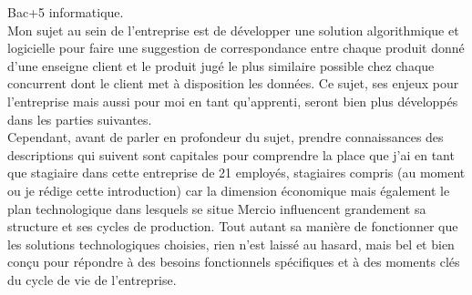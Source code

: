 \documentclass{rapportCS}
\begin{document}
	Bac+5 informatique.\\
	Mon sujet au sein de l'entreprise est de développer une solution algorithmique et logicielle pour 
	faire une suggestion de correspondance entre chaque produit donné d'une enseigne client et le 
	produit jugé le plus similaire possible chez chaque concurrent 
	dont le client met à disposition les données. 
	Ce sujet, ses enjeux pour l'entreprise mais aussi pour moi en tant qu'apprenti,
	seront bien plus développés dans les parties suivantes.\\
	Cependant, avant de parler en profondeur du sujet, prendre connaissances des descriptions qui
	suivent sont capitales pour comprendre la place que j'ai en tant que stagiaire dans cette 
	entreprise de 21 employés, stagiaires compris (au moment ou je rédige cette introduction) car la
	dimension économique mais également le plan technologique dans lesquels se situe Mercio influencent 
	grandement sa structure et ses cycles de production. Tout autant sa manière de fonctionner que les 
	solutions technologiques choisies, rien n'est laissé au hasard, mais bel et bien conçu pour 
	répondre à des besoins fonctionnels spécifiques et à des moments clés du cycle de vie de 
	l'entreprise.
\end{document}
